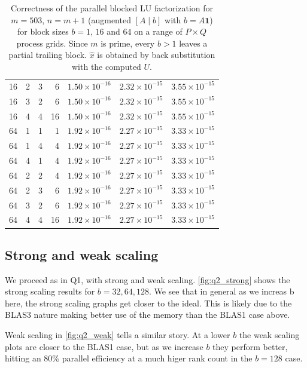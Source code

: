 \documentclass[11pt]{article}
\begin{document}
\begin{table}
\begin{tabular}{rrrr ccc}
    16 & 2 & 3 &  6 & $1.50\times10^{-16}$ & $2.32\times10^{-15}$ & $3.55\times10^{-15}$ \\
    16 & 3 & 2 &  6 & $1.50\times10^{-16}$ & $2.32\times10^{-15}$ & $3.55\times10^{-15}$ \\
    16 & 4 & 4 & 16 & $1.50\times10^{-16}$ & $2.32\times10^{-15}$ & $3.55\times10^{-15}$ \\
    \midrule
    64 & 1 & 1 &  1 & $1.92\times10^{-16}$ & $2.27\times10^{-15}$ & $3.33\times10^{-15}$ \\
    64 & 1 & 4 &  4 & $1.92\times10^{-16}$ & $2.27\times10^{-15}$ & $3.33\times10^{-15}$ \\
    64 & 4 & 1 &  4 & $1.92\times10^{-16}$ & $2.27\times10^{-15}$ & $3.33\times10^{-15}$ \\
    64 & 2 & 2 &  4 & $1.92\times10^{-16}$ & $2.27\times10^{-15}$ & $3.33\times10^{-15}$ \\
    64 & 2 & 3 &  6 & $1.92\times10^{-16}$ & $2.27\times10^{-15}$ & $3.33\times10^{-15}$ \\
    64 & 3 & 2 &  6 & $1.92\times10^{-16}$ & $2.27\times10^{-15}$ & $3.33\times10^{-15}$ \\
    64 & 4 & 4 & 16 & $1.92\times10^{-16}$ & $2.27\times10^{-15}$ & $3.33\times10^{-15}$ \\
    \bottomrule
  \end{tabular}
  \caption{Correctness of the parallel blocked LU factorization for
    $m = 503$, $n = m+1$ (augmented $[A \mid{} b]$ with $b = A\mathbf{1}$)
    for block sizes $b = 1$, $16$ and $64$ on a range of $P \times Q$ process grids.
    Since $m$ is prime, every $b > 1$ leaves a partial trailing block.
    $\hat{x}$ is obtained by back substitution with the computed $U$.}
    \label{tab:lu-correctness-q2}
\end{table}

\FloatBarrier

\subsection{Strong and weak scaling}
We proceed as in Q1, with strong and weak scaling.
\cref{fig:q2_strong} shows the strong scaling results for $b = 32, 64, 128$. We see that in general as we increas b here, the strong scaling graphs get closer to the ideal.
This is likely due to the BLAS3 nature making better use of the memory than the BLAS1 case above.

Weak scaling in \cref{fig:q2_weak} tells a similar story. At a lower $b$ the weak scaling plots are closer to the BLAS1 case,
but as we increase $b$ they perform better, hitting an 80\% parallel efficiency at a much higer rank count in the $b=128$ case.
\end{document}
